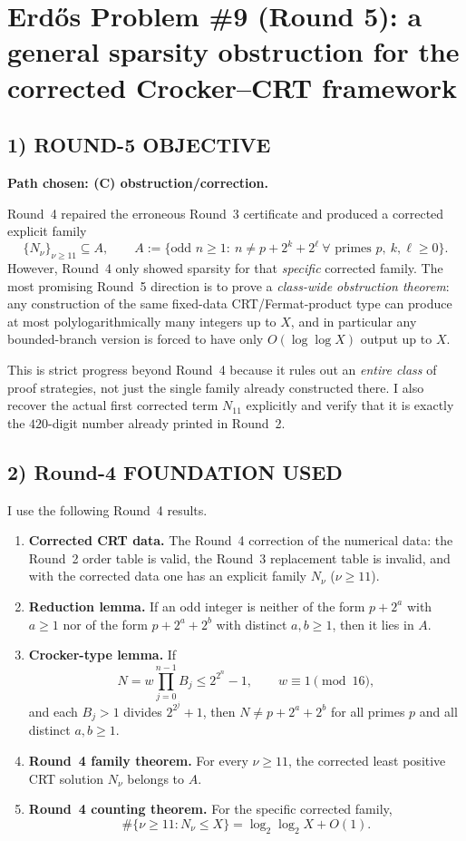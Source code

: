 \section{Erd\H{o}s Problem \#9 (Round 5): a general sparsity obstruction for the corrected Crocker--CRT framework}

\subsection*{1) ROUND-5 OBJECTIVE}

\noindent\textbf{Path chosen: (C) obstruction/correction.}

\medskip
Round~4 repaired the erroneous Round~3 certificate and produced a corrected explicit family
\[
\{N_\nu\}_{\nu\ge 11}\subseteq A,
\qquad
A:=\{\text{odd }n\ge 1:\ n\neq p+2^k+2^\ell\ \forall\text{ primes }p,\ k,\ell\ge 0\}.
\]
However, Round~4 only showed sparsity for that \emph{specific} corrected family. The most promising Round~5 direction is to prove a \emph{class-wide obstruction theorem}: any construction of the same fixed-data CRT/Fermat-product type can produce at most polylogarithmically many integers up to $X$, and in particular any bounded-branch version is forced to have only $O(\log\log X)$ output up to $X$.

This is strict progress beyond Round~4 because it rules out an \emph{entire class} of proof strategies, not just the single family already constructed there. I also recover the actual first corrected term $N_{11}$ explicitly and verify that it is exactly the $420$-digit number already printed in Round~2.

\subsection*{2) Round-4 FOUNDATION USED}

I use the following Round~4 results.

\begin{enumerate}
\item \textbf{Corrected CRT data.} The Round~4 correction of the numerical data: the Round~2 order table is valid, the Round~3 replacement table is invalid, and with the corrected data one has an explicit family $N_\nu$ ($\nu\ge 11$).
\item \textbf{Reduction lemma.} If an odd integer is neither of the form $p+2^a$ with $a\ge 1$ nor of the form $p+2^a+2^b$ with distinct $a,b\ge 1$, then it lies in $A$.
\item \textbf{Crocker-type lemma.} If
\[
N=w\prod_{j=0}^{n-1}B_j\le 2^{2^n}-1,\qquad w\equiv 1\pmod{16},
\]
and each $B_j>1$ divides $2^{2^j}+1$, then $N\neq p+2^a+2^b$ for all primes $p$ and all distinct $a,b\ge 1$.
\item \textbf{Round~4 family theorem.} For every $\nu\ge 11$, the corrected least positive CRT solution $N_\nu$ belongs to $A$.
\item \textbf{Round~4 counting theorem.} For the specific corrected family,
\[
\#\{\nu\ge 11:N_\nu\le X\}=\log_2\log_2 X+O(1).
\]
\end{enumerate}

